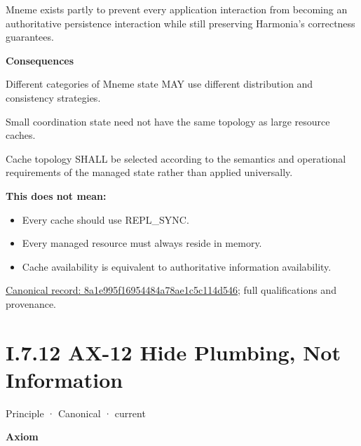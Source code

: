 Mneme exists partly to prevent every application interaction from
becoming an authoritative persistence interaction while still preserving
Harmonia's correctness guarantees.



\par\medskip\textbf{Consequences}\par


Different categories of Mneme state MAY use different distribution and
consistency strategies.



Small coordination state need not have the same topology as large
resource caches.



Cache topology SHALL be selected according to the semantics and
operational requirements of the managed state rather than applied
universally.



\textbf{This does not mean:}



\begin{itemize}


\item Every cache should use REPL\_SYNC.

\item Every managed resource must always reside in memory.

\item Cache availability is equivalent to authoritative information availability.

\end{itemize}

{\footnotesize \href{../../../../../../../../continuum/motivation/principle/8a1e995f16954484a78ae1c5c114d546.md}{Canonical record: 8a1e995f16954484a78ae1c5c114d546}; full qualifications and provenance.}\par
\section*{I.7.12 AX-12 Hide Plumbing, Not Information}
\label{navigation:I.7.12}

\label{element:ce85889bd9b34f79a53d4c907ceb19d4}
{\small Principle · Canonical · current}\par

\par\medskip\textbf{Axiom}\par


